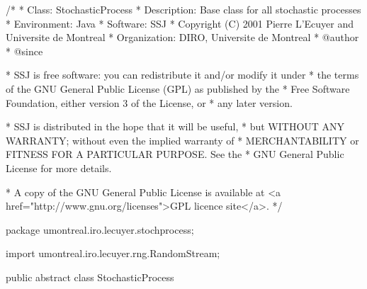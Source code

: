 \begin{code}
\begin{hide}
/*
 * Class:        StochasticProcess
 * Description:  Base class for all stochastic processes
 * Environment:  Java
 * Software:     SSJ 
 * Copyright (C) 2001  Pierre L'Ecuyer and Universite de Montreal
 * Organization: DIRO, Universite de Montreal
 * @author       
 * @since

 * SSJ is free software: you can redistribute it and/or modify it under
 * the terms of the GNU General Public License (GPL) as published by the
 * Free Software Foundation, either version 3 of the License, or
 * any later version.

 * SSJ is distributed in the hope that it will be useful,
 * but WITHOUT ANY WARRANTY; without even the implied warranty of
 * MERCHANTABILITY or FITNESS FOR A PARTICULAR PURPOSE.  See the
 * GNU General Public License for more details.

 * A copy of the GNU General Public License is available at
   <a href="http://www.gnu.org/licenses">GPL licence site</a>.
 */
\end{hide}
package umontreal.iro.lecuyer.stochprocess;\begin{hide}
import umontreal.iro.lecuyer.rng.RandomStream;
\end{hide}


public abstract class StochasticProcess \begin{hide} {
    // Used in some subclasses to make sure the 'setObservationTimes'
    // method has already been invoked before calling 'init'
    protected boolean observationTimesSet = false;

    protected double x0 = 0.0;       // Default Initial Value of the process
    protected int d = -1;             // Num. of observation times
    protected int observationIndex = 0; // Index of last generated obs time
    protected int observationCounter = 0; // Counts how many observations have
              // been generated so far. Useful when they are not generated in
              // chronological order.
    protected double[] t;            // Observation times
    protected double[] path;            // Observations of the process
    //protected RandomStream stream; // Random stream used to generate the process
    protected int[] observationIndexFromCounter; // Links counter# to index#
\end{hide}
\end{code}

